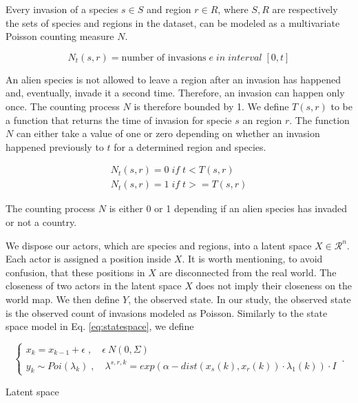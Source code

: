 \documentclass[mscthesis]{usiinfthesis}
\begin{document}

Every invasion of a species $s \in S$ and region $r \in R$, where $S, R$ are respectively the sets of species and regions in the dataset, can be modeled as a multivariate Poisson counting measure  $N$.

\[
N_t(s, r) = \textrm{number of invasions} \; e \; in \; interval \; [0, t]
\]

An alien species is not allowed to leave a region after an invasion has happened and, eventually, invade it a second time. Therefore, an invasion can happen only once. The counting process $N$ is therefore bounded by 1. We define $T(s, r)$ to be a function that returns the time of invasion for specie $s$ an region $r$. The function $N$ can either take a value of one or zero depending on whether an invasion happened previously to $t$ for a determined region and species.


\begin{eqfloat}
\begin{equation}
\begin{array}{l}
N_t(s, r) = 0 \; if \; t < T(s, r) \\
N_t(s, r) = 1 \; if \; t >= T(s, r)
\end{array}
\label{eq:counting process}
\end{equation}
\caption{The counting process $N$ is either 0 or 1 depending if an alien species has invaded or not a country.}
\end{eqfloat}


We dispose our actors, which are species and regions, into a latent space $X \in \mathcal{R}^n$. Each actor is assigned a position inside $X$. It is worth mentioning, to avoid confusion, that these positions in $X$ are disconnected from the real world. The closeness of two actors in the latent space $X$ does not imply their closeness on the world map. We then define $Y$, the observed state. In our study, the observed state is the observed count of invasions modeled as Poisson. Similarly to the state space model in Eq. \ref{eq:statespace}, we define

\begin{eqfloat}
\begin{equation}
    \begin{cases}
      x_k = x_{k-1} + \epsilon \; , \quad \epsilon ~ N(0, \Sigma) \\
      y_k \sim Poi(\lambda_k) \; , \quad \lambda^{s, r, k} = exp\left(\alpha-dist(x_s(k), x_r(k)) \cdot \lambda_1(k) \right) \cdot I
    \end{cases}\,.
\label{eq:latentspace}
\end{equation}
\caption{Latent space}
\end{eqfloat}
\end{document}
